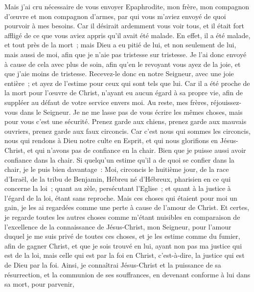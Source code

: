 \begin{multicols}{2}
Mais j'ai cru nécessaire de vous envoyer Epaphrodite, mon frère, mon compagnon d'œuvre et mon compagnon d'armes, par qui vous m'aviez envoyé de quoi pourvoir à mes besoins.
Car il désirait ardemment vous voir tous, et il était fort affligé de ce que vous aviez appris qu'il avait été malade.
En effet, il a été malade, et tout près de la mort~; mais Dieu a eu pitié de lui, et non seulement de lui, mais aussi de moi, afin que je n'aie pas tristesse sur tristesse.
Je l'ai donc envoyé à cause de cela avec plus de soin, afin qu'en le revoyant vous ayez de la joie, et que j'aie moins de tristesse.
Recevez-le donc en notre Seigneur, avec une joie entière~; et ayez de l'estime pour ceux qui sont tels que lui.
Car il a été proche de la mort pour l'œuvre de Christ, n'ayant eu aucun égard à sa propre vie, afin de suppléer au défaut de votre service envers moi.
\VerseOne{}Au reste, mes frères, réjouissez-vous dans le Seigneur. Je ne me lasse pas de vous écrire les mêmes choses, mais pour vous c'est une sécurité.
Prenez garde aux chiens, prenez garde aux mauvais ouvriers, prenez garde aux faux circoncis.
Car c'est nous qui sommes les circoncis, nous qui rendons à Dieu notre culte en Esprit, et qui nous glorifions en Jésus-Christ, et qui n'avons pas de confiance en la chair.
Bien que je puisse aussi avoir confiance dans la chair. Si quelqu'un estime qu'il a de quoi se confier dans la chair, je le puis bien davantage~:
Moi, circoncis le huitième jour, de la race d'Israël, de la tribu de Benjamin, Hébreu né d'Hébreux, pharisien en ce qui concerne la loi~;
quant au zèle, persécutant l'Eglise~; et quant à la justice à l'égard de la loi, étant sans reproche.
Mais ces choses qui étaient pour moi un gain, je les ai regardées comme une perte à cause de l'amour de Christ.
Et certes, je regarde toutes les autres choses comme m'étant nuisibles en comparaison de l'excellence de la connaissance de Jésus-Christ, mon Seigneur, pour l'amour duquel je me suis privé de toutes ces choses, et je les estime comme du fumier, afin de gagner Christ,
et que je sois trouvé en lui, ayant non pas ma justice qui est de la loi, mais celle qui est par la foi en Christ, c'est-à-dire, la justice qui est de Dieu par la foi.
Ainsi, je connaîtrai Jésus-Christ et la puissance de sa résurrection, et la communion de ses souffrances, en devenant conforme à lui dans sa mort, pour parvenir,

\end{multicols}
